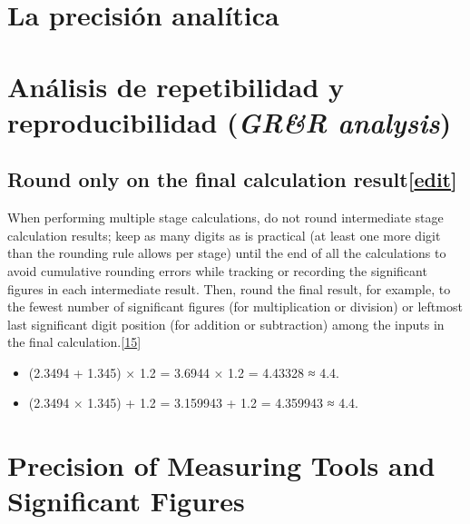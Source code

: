\documentclass[
  letterpaper,
  DIV=11,
  numbers=noendperiod,
  oneside]{scrreprt}
\providecommand{\tightlist}{%
  \setlength{\itemsep}{0pt}\setlength{\parskip}{0pt}}\usepackage{longtable,booktabs,array}
\begin{document}
\hypertarget{la-precisiuxf3n-analuxedtica}{%
\section{La precisión analítica}\label{la-precisiuxf3n-analuxedtica}}

\hypertarget{anuxe1lisis-de-repetibilidad-y-reproducibilidad-grr-analysis}{%
\section{\texorpdfstring{Análisis de repetibilidad y reproducibilidad
(\emph{GR\&R
analysis})}{Análisis de repetibilidad y reproducibilidad (GR\&R analysis)}}\label{anuxe1lisis-de-repetibilidad-y-reproducibilidad-grr-analysis}}

\hypertarget{round-only-on-the-final-calculation-resultedit}{%
\subsection{\texorpdfstring{Round only on the final calculation
result{[}\href{https://en.wikipedia.org/w/index.php?title=Significant_figures\&action=edit\&section=14}{edit}{]}}{Round only on the final calculation result{[}edit{]}}}\label{round-only-on-the-final-calculation-resultedit}}

When performing multiple stage calculations, do not round intermediate
stage calculation results; keep as many digits as is practical (at least
one more digit than the rounding rule allows per stage) until the end of
all the calculations to avoid cumulative rounding errors while tracking
or recording the significant figures in each intermediate result. Then,
round the final result, for example, to the fewest number of significant
figures (for multiplication or division) or leftmost last significant
digit position (for addition or subtraction) among the inputs in the
final
calculation.{[}\href{https://en.wikipedia.org/wiki/Significant_figures\#cite_note-15}{15{]}}

\begin{itemize}
\tightlist
\item
  (2.3494 + 1.345) × 1.2 = 3.6944 × 1.2 = 4.43328 ≈ 4.4.
\item
  (2.3494 × 1.345) + 1.2 = 3.159943 + 1.2 = 4.359943 ≈ 4.4.
\end{itemize}

\hypertarget{precision-of-measuring-tools-and-significant-figures}{%
\section{Precision of Measuring Tools and Significant
Figures}\label{precision-of-measuring-tools-and-significant-figures}}
\end{document}
